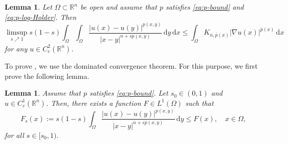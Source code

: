 \documentclass[11pt]{amsart}
\theoremstyle{plain}
\newtheorem{lemma}[theorem]{Lemma}
\theoremstyle{definition}
\numberwithin{equation}{section}
\begin{document}
\begin{lemma} \label{lem:limsup}
Let $\Omega \subset \mathbb{R}^{n}$ be open and assume that $p$ satisfies \eqref{eq:p-bound} and \eqref{eq:p-log-Holder}. Then
\begin{equation} \label{eq:limsup}
\limsup_{s \nearrow 1} s(1-s) \int_{\Omega} \int_{\Omega} \frac{|u(x)-u(y)|^{p(x, y)}}{|x-y|^{n+sp(x, y)}} \,\mathrm{d}y \,\mathrm{d}x \leq \int_{\Omega} K_{n, \bar{p}(x)} |\nabla u(x)|^{\bar{p}(x)} \,\mathrm{d}x
\end{equation}
for any $u \in C^{2}_{c}(\mathbb{R}^n)$.
\end{lemma}

To prove , we use the dominated convergence theorem. For this purpose, we first prove the following lemma.

\begin{lemma} \label{lem:DCT}
Assume that $p$ satisfies \eqref{eq:p-bound}. Let $s_{0} \in (0,1)$ and $u \in C^{1}_{c}(\mathbb{R}^{n})$. Then, there exists a function $F \in L^{1}(\Omega)$ such that
\begin{equation} \label{eq:Fs}
F_{s}(x):= s(1-s) \int_{\Omega} \frac{|u(x)-u(y)|^{p(x, y)}}{|x-y|^{n+sp(x, y)}} \,\mathrm{d}y \leq F(x), \quad x \in \Omega,
\end{equation}
for all $s \in [s_{0} ,1)$.
\end{lemma}
\end{document}
